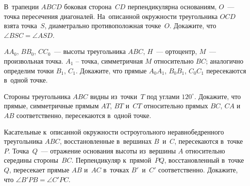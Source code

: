 \begin{problems}
\item
В~трапеции $ABCD$ боковая сторона~$CD$ перпендикулярна основаниям,
$O$~--- точка пересечения диагоналей.
На~описанной окружности треугольника $OCD$ взята точка~$S$, диаметрально
противоположная точке~$O$.
Докажите, что $\angle BSC = \angle ASD$.

\item
$AA_{0}$, $BB_{0}$, $CC_{0}$~--- высоты треугольника $ABC$,
$H$~--- ортоцентр,
$M$~--- произвольная точка.
$A_{1}$ -- точка, симметричная $M$ относительно $BC$;
аналогично определим точки $B_{1}$, $C_{1}$.
Докажите, что прямые $A_{0}A_{1}$, $B_{0}B_{1}$, $C_{0}C_{1}$ пересекаются
в~одной точке.

\item
Стороны треугольника $ABC$ видны из~точки~$T$ под углами $120^{\circ}$.
Докажите, что прямые, симметричные прямым $AT$, $BT$ и~$CT$ относительно
прямых $BC$, $CA$ и~$AB$ соответственно, пересекаются в~одной точке.


\item
Касательные к~описанной окружности остроугольного неравнобедренного
треугольника $ABC$, восстановленные в~вершинах $B$~и~$C$, пересекаются
в~точке~$P$.
Точка~$Q$~--- отражение основания высоты из~вершины $A$ относительно середины
стороны~$BC$.
Перпендикуляр к~прямой~$PQ$, восстановленный в~точке~$Q$, пересекает
прямые $AB$ и~$AC$ в~точках $B'$~и~$C'$ соответственно.
Докажите, что $\angle B'PB = \angle C'PC$.

\end{problems}

